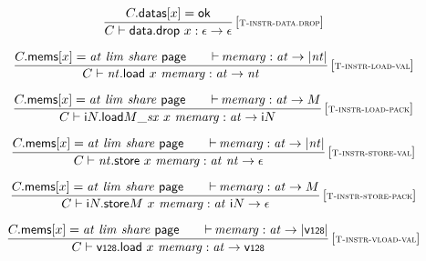 $$
\begin{array}{@{}c@{}}\displaystyle
\frac{
C{.}\mathsf{datas}{}[x] = \mathsf{ok}
}{
C \vdash \mathsf{data{.}drop}~x : \epsilon \rightarrow \epsilon
} \, {[\textsc{\scriptsize T{-}instr{-}data.drop}]}
\qquad
\end{array}
$$

$$
\begin{array}{@{}c@{}}\displaystyle
\frac{
C{.}\mathsf{mems}{}[x] = {\mathit{at}}~{\mathit{lim}}~{\mathit{share}}~\mathsf{page}
 \qquad
{\vdash}\, {\mathit{memarg}} : {\mathit{at}} \rightarrow {|{\mathit{nt}}|}
}{
C \vdash {\mathit{nt}}{.}\mathsf{load}~x~{\mathit{memarg}} : {\mathit{at}} \rightarrow {\mathit{nt}}
} \, {[\textsc{\scriptsize T{-}instr{-}load{-}val}]}
\qquad
\end{array}
$$

$$
\begin{array}{@{}c@{}}\displaystyle
\frac{
C{.}\mathsf{mems}{}[x] = {\mathit{at}}~{\mathit{lim}}~{\mathit{share}}~\mathsf{page}
 \qquad
{\vdash}\, {\mathit{memarg}} : {\mathit{at}} \rightarrow M
}{
C \vdash {{\mathsf{i}}{N}{.}\mathsf{load}}{{M}{\mathsf{\_}}{{\mathit{sx}}}}~x~{\mathit{memarg}} : {\mathit{at}} \rightarrow {\mathsf{i}}{N}
} \, {[\textsc{\scriptsize T{-}instr{-}load{-}pack}]}
\qquad
\end{array}
$$

$$
\begin{array}{@{}c@{}}\displaystyle
\frac{
C{.}\mathsf{mems}{}[x] = {\mathit{at}}~{\mathit{lim}}~{\mathit{share}}~\mathsf{page}
 \qquad
{\vdash}\, {\mathit{memarg}} : {\mathit{at}} \rightarrow {|{\mathit{nt}}|}
}{
C \vdash {\mathit{nt}}{.}\mathsf{store}~x~{\mathit{memarg}} : {\mathit{at}}~{\mathit{nt}} \rightarrow \epsilon
} \, {[\textsc{\scriptsize T{-}instr{-}store{-}val}]}
\qquad
\end{array}
$$

$$
\begin{array}{@{}c@{}}\displaystyle
\frac{
C{.}\mathsf{mems}{}[x] = {\mathit{at}}~{\mathit{lim}}~{\mathit{share}}~\mathsf{page}
 \qquad
{\vdash}\, {\mathit{memarg}} : {\mathit{at}} \rightarrow M
}{
C \vdash {{\mathsf{i}}{N}{.}\mathsf{store}}{M}~x~{\mathit{memarg}} : {\mathit{at}}~{\mathsf{i}}{N} \rightarrow \epsilon
} \, {[\textsc{\scriptsize T{-}instr{-}store{-}pack}]}
\qquad
\end{array}
$$

$$
\begin{array}{@{}c@{}}\displaystyle
\frac{
C{.}\mathsf{mems}{}[x] = {\mathit{at}}~{\mathit{lim}}~{\mathit{share}}~\mathsf{page}
 \qquad
{\vdash}\, {\mathit{memarg}} : {\mathit{at}} \rightarrow {|\mathsf{v{\scriptstyle 128}}|}
}{
C \vdash \mathsf{v{\scriptstyle 128}}{.}\mathsf{load}~x~{\mathit{memarg}} : {\mathit{at}} \rightarrow \mathsf{v{\scriptstyle 128}}
} \, {[\textsc{\scriptsize T{-}instr{-}vload{-}val}]}
\qquad
\end{array}
$$

